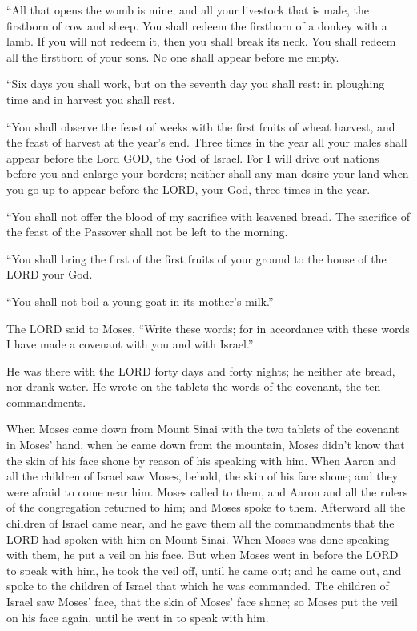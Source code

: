  ``All that opens the womb is mine; and all your
livestock that is male, the firstborn of cow and sheep. 
You shall redeem the firstborn of a donkey with a lamb. If you will not
redeem it, then you shall break its neck. You shall redeem all the
firstborn of your sons. No one shall appear before me empty.

 ``Six days you shall work, but on the seventh day you
shall rest: in ploughing time and in harvest you shall rest.

 ``You shall observe the feast of weeks with the first
fruits of wheat harvest, and the feast of harvest at the year's end.
 Three times in the year all your males shall appear
before the Lord GOD, the God of Israel.  For I will drive
out nations before you and enlarge your borders; neither shall any man
desire your land when you go up to appear before the LORD, your God,
three times in the year.

 ``You shall not offer the blood of my sacrifice with
leavened bread. The sacrifice of the feast of the Passover shall not be
left to the morning.

 ``You shall bring the first of the first fruits of your
ground to the house of the LORD your God.

``You shall not boil a young goat in its mother's milk.''

 The LORD said to Moses, ``Write these words; for in
accordance with these words I have made a covenant with you and with
Israel.''

 He was there with the LORD forty days and forty nights;
he neither ate bread, nor drank water. He wrote on the tablets the words
of the covenant, the ten commandments.

 When Moses came down from Mount Sinai with the two
tablets of the covenant in Moses' hand, when he came down from the
mountain, Moses didn't know that the skin of his face shone by reason of
his speaking with him.  When Aaron and all the children
of Israel saw Moses, behold, the skin of his face shone; and they were
afraid to come near him.  Moses called to them, and Aaron
and all the rulers of the congregation returned to him; and Moses spoke
to them.  Afterward all the children of Israel came near,
and he gave them all the commandments that the LORD had spoken with him
on Mount Sinai.  When Moses was done speaking with them,
he put a veil on his face.  But when Moses went in before
the LORD to speak with him, he took the veil off, until he came out; and
he came out, and spoke to the children of Israel that which he was
commanded.  The children of Israel saw Moses' face, that
the skin of Moses' face shone; so Moses put the veil on his face again,
until he went in to speak with him.

